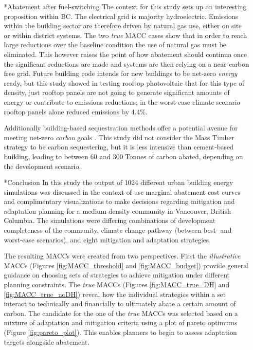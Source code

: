 \documentclass[twocolumn, a4paper,10pt]{article}
\makeatletter
\renewcommand\section{\@startsection{section}{1}{\z@}{3pt}{3pt}{\normalfont\large\bfseries}}
\renewcommand\subsection{\@startsection{subsection}{1}{\z@}{\z@}{\z@}{\normalfont\normalsize\bfseries}}
\renewcommand\subsection{\@startsection{subsection}{1}{\z@}{\z@}{0.1pt}{\normalfont\normalsize\bfseries}}
\makeatother
\begin{document}
\subsection*{Abatement after fuel-switching}
The context for this study sets up an interesting proposition within BC. The electrical grid is majority hydroelectric. Emissions within the building sector are therefore driven by natural gas use, either on site or within district systems. The two \textit{true} MACC cases show that in order to reach large reductions over the baseline condition the use of natural gas must be eliminated. This however raises the point of how abatement should continua once the significant reductions are made and systems are then relying on a near-carbon free grid. Future building code intends for new buildings to be net-zero \textit{energy} ready, but this study showed in testing rooftop photovoltaic that for this type of density, just rooftop panels are not going to generate significant amounts of energy or contribute to emissions reductions; in the worst-case climate scenario rooftop panels alone reduced emissions by 4.4\%. 

Additionally building-based sequestration methods offer a potential avenue for meeting net-zero \textit{carbon} goals \citep{skullestad_high-rise_2016, zeitz_comparing_2019}. This study did not consider the Mass Timber strategy to be carbon sequestering, but it is less intensive than cement-based building, leading to between 60 and 300 Tonnes of carbon abated, depending on the development scenario.


\section*{Conclusion}
In this study the output of 1024 different urban building energy simulations was discussed in the context of use marginal abatement cost curves and complimentary visualizations to make decisions regarding mitigation and adaptation planning for a medium-density community in Vancouver, British Columbia. The simulations were differing combinations of development completeness of the community, climate change pathway (between best- and worst-case scenarios), and eight mitigation and adaptation strategies. 

The resulting MACCs were created from two perspectives. First the \textit{illustrative} MACCs (Figures \ref{fig:MACC_threshold} and \ref{fig:MACC_budget}) provide general guidance on choosing sets of strategies to achieve mitigation under different planning constraints. The \textit{true} MACCs (Figures \ref{fig:MACC_true_DH} and \ref{fig:MACC_true_noDH}) reveal how the individual strategies within a set interact to technically and financially to ultimately abate a certain amount of carbon. The candidate for the one of the \textit{true} MACCs was selected based on a mixture of adaptation and mitigation criteria using a plot of pareto optimums (Figure \ref{fig:pareto_plot}). This enables planners to begin to assess adaptation targets alongside abatement.
\end{document}
